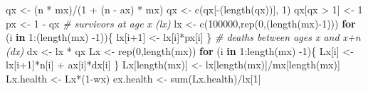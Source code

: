 \documentclass[
]{article}
\newenvironment{Shaded}{\begin{snugshade}}{\end{snugshade}}
\newcommand{\CommentTok}[1]{\textcolor[rgb]{0.56,0.35,0.01}{\textit{#1}}}
\newcommand{\ControlFlowTok}[1]{\textcolor[rgb]{0.13,0.29,0.53}{\textbf{#1}}}
\newcommand{\DecValTok}[1]{\textcolor[rgb]{0.00,0.00,0.81}{#1}}
\newcommand{\FunctionTok}[1]{\textcolor[rgb]{0.00,0.00,0.00}{#1}}
\newcommand{\NormalTok}[1]{#1}
\newcommand{\OtherTok}[1]{\textcolor[rgb]{0.56,0.35,0.01}{#1}}
\newcommand{\SpecialCharTok}[1]{\textcolor[rgb]{0.00,0.00,0.00}{#1}}
\begin{document}
\begin{Shaded}
\begin{Highlighting}[]
\NormalTok{  qx }\OtherTok{\textless{}{-}}\NormalTok{ (n }\SpecialCharTok{*}\NormalTok{ mx)}\SpecialCharTok{/}\NormalTok{(}\DecValTok{1} \SpecialCharTok{+}\NormalTok{ (n }\SpecialCharTok{{-}}\NormalTok{ ax) }\SpecialCharTok{*}\NormalTok{ mx)}
\NormalTok{  qx }\OtherTok{\textless{}{-}} \FunctionTok{c}\NormalTok{(qx[}\SpecialCharTok{{-}}\NormalTok{(}\FunctionTok{length}\NormalTok{(qx))], }\DecValTok{1}\NormalTok{)}
\NormalTok{  qx[qx }\SpecialCharTok{\textgreater{}} \DecValTok{1}\NormalTok{] }\OtherTok{\textless{}{-}} \DecValTok{1}
\NormalTok{  px }\OtherTok{\textless{}{-}} \DecValTok{1} \SpecialCharTok{{-}}\NormalTok{ qx}
  \CommentTok{\# survivors at age x (lx)}
\NormalTok{  lx }\OtherTok{\textless{}{-}} \FunctionTok{c}\NormalTok{(}\DecValTok{100000}\NormalTok{,}\FunctionTok{rep}\NormalTok{(}\DecValTok{0}\NormalTok{,(}\FunctionTok{length}\NormalTok{(mx)}\SpecialCharTok{{-}}\DecValTok{1}\NormalTok{)))}
  \ControlFlowTok{for}\NormalTok{ (i }\ControlFlowTok{in} \DecValTok{1}\SpecialCharTok{:}\NormalTok{(}\FunctionTok{length}\NormalTok{(mx) }\SpecialCharTok{{-}}\DecValTok{1}\NormalTok{))\{}
\NormalTok{    lx[i}\SpecialCharTok{+}\DecValTok{1}\NormalTok{] }\OtherTok{\textless{}{-}}\NormalTok{ lx[i]}\SpecialCharTok{*}\NormalTok{px[i] \}}
  \CommentTok{\# deaths between ages x and x+n (dx)}
\NormalTok{  dx }\OtherTok{\textless{}{-}}\NormalTok{ lx }\SpecialCharTok{*}\NormalTok{ qx}
\NormalTok{  Lx }\OtherTok{\textless{}{-}} \FunctionTok{rep}\NormalTok{(}\DecValTok{0}\NormalTok{,}\FunctionTok{length}\NormalTok{(mx))}
  \ControlFlowTok{for}\NormalTok{ (i }\ControlFlowTok{in} \DecValTok{1}\SpecialCharTok{:}\FunctionTok{length}\NormalTok{(mx) }\SpecialCharTok{{-}}\DecValTok{1}\NormalTok{)\{}
\NormalTok{    Lx[i] }\OtherTok{\textless{}{-}}\NormalTok{ lx[i}\SpecialCharTok{+}\DecValTok{1}\NormalTok{]}\SpecialCharTok{*}\NormalTok{n[i] }\SpecialCharTok{+}\NormalTok{ ax[i]}\SpecialCharTok{*}\NormalTok{dx[i] \}}
\NormalTok{  Lx[}\FunctionTok{length}\NormalTok{(mx)] }\OtherTok{\textless{}{-}}\NormalTok{ lx[}\FunctionTok{length}\NormalTok{(mx)]}\SpecialCharTok{/}\NormalTok{mx[}\FunctionTok{length}\NormalTok{(mx)]}
\NormalTok{  Lx.health }\OtherTok{\textless{}{-}}\NormalTok{ Lx}\SpecialCharTok{*}\NormalTok{(}\DecValTok{1}\SpecialCharTok{{-}}\NormalTok{wx)}
\NormalTok{  ex.health }\OtherTok{\textless{}{-}} \FunctionTok{sum}\NormalTok{(Lx.health)}\SpecialCharTok{/}\NormalTok{lx[}\DecValTok{1}\NormalTok{]}
  

\end{Highlighting}
\end{Shaded}
\end{document}
